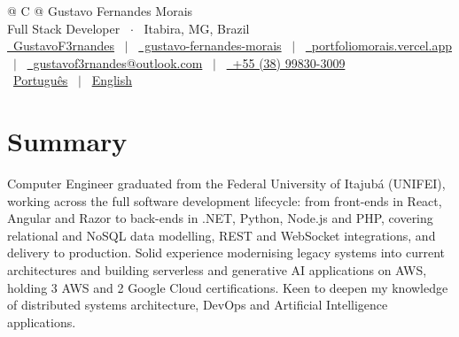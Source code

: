 \documentclass[a4paper,11pt]{article}
\begin{document}
\pagestyle{empty}


\begin{tabularx}{\linewidth}{@{} C @{}}
\Huge{Gustavo Fernandes Morais} \\[4pt]
\normalsize{Full Stack Developer \ $\cdot$ \ Itabira, MG, Brazil} \\[7.5pt]
\href{https://github.com/GustavoF3rnandes}{\raisebox{-0.05\height}\faGithub\ GustavoF3rnandes} \ $|$ \
\href{https://www.linkedin.com/in/gustavo-fernandes-morais-6737a9243/}{\raisebox{-0.05\height}\faLinkedin\ gustavo-fernandes-morais} \ $|$ \
\href{https://portfoliomorais.vercel.app/}{\raisebox{-0.05\height}\faGlobe \ portfoliomorais.vercel.app} \ $|$ \
\href{mailto:gustavof3rnandes@outlook.com}{\raisebox{-0.05\height}\faEnvelope \ gustavof3rnandes@outlook.com} \ $|$ \
\href{tel:+5538998303009}{\raisebox{-0.05\height}\faMobile \ +55 (38) 99830-3009} \\[3pt]
\small{\raisebox{-0.05\height}\faLanguage \
\href{https://gustavof3rnandes.github.io/Curriculo/cv.pdf}{Português} \ $|$ \
\href{https://gustavof3rnandes.github.io/Curriculo/cv-en.pdf}{English}} \\
\end{tabularx}


\section{Summary}
Computer Engineer graduated from the Federal University of Itajubá (UNIFEI), working across the full software development lifecycle: from front-ends in React, Angular and Razor to back-ends in .NET, Python, Node.js and PHP, covering relational and NoSQL data modelling, REST and WebSocket integrations, and delivery to production. Solid experience modernising legacy systems into current architectures and building serverless and generative AI applications on AWS, holding 3 AWS and 2 Google Cloud certifications. Keen to deepen my knowledge of distributed systems architecture, DevOps and Artificial Intelligence applications.
\end{document}
